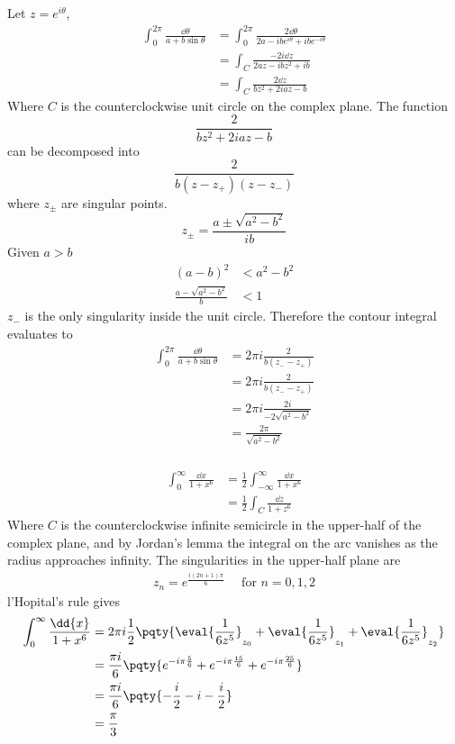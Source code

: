 \documentclass[12pt]{article}
\begin{document}
    \subsubsection{} Let \(z = e^{i\theta}\), \begin{align*}
        \int_0^{2\pi} \frac{\dd{\theta}}{a + b\sin\theta} &= \int_0^{2\pi} \frac{2\dd{\theta}}{2a - ib e^{i\theta} + ib e^{ - i\theta}}\\
        &= \int_C \frac{ -2i \dd{z}}{2a z - ib z^2 + ib }\\
        &= \int_C \frac{2 \dd{z}}{ bz^2 + 2iaz -b}
    \end{align*}
    Where \(C\) is the counterclockwise unit circle on the complex plane. The function \[
        \frac{2}{ bz^2 + 2iaz -b}
    \]
    can be decomposed into \[
        \frac{2}{b(z - z_ +)(z - z_ -)}
    \]where \(z_\pm\) are singular points. \[
        z_\pm = \frac{ a \pm \sqrt{a^2 - b^2}}{ib} 
    \] Given \(a > b\) \begin{align*}
        (a - b)^2 &< a^2 - b^2\\
        \frac{a - \sqrt{a^2 - b^2}}{b}  &< 1
    \end{align*}
    \(z_ -\) is the only singularity inside the unit circle. Therefore the contour integral evaluates to \begin{align*}
        \int_0^{2\pi} \frac{\dd{\theta}}{a + b\sin\theta} &= 2\pi i \frac{2}{b(z_ -- z_ +)}\\
        &= 2\pi i \frac{2}{b(z_ -- z_ +)}\\
        &= 2\pi i \frac{2i}{ - 2 \sqrt{a^2 - b^2}}\\
        &=  \frac{2\pi}{\sqrt{a^2 - b^2}}
    \end{align*}
    \subsubsection{}  \begin{align*}
        \int_0^\infty \frac{\dd{x}}{1 + x^6} &= \frac{1}{2} \int_{ - \infty}^\infty \frac{\dd{x}}{1 + x^6} \\
        &= \frac{1}{2} \int_C \frac{\dd{z}}{1 + z^6} 
    \end{align*}
    Where \(C\) is the counterclockwise infinite semicircle in the upper-half of the complex plane, and by Jordan's lemma the integral on the arc vanishes as the radius approaches infinity. The singularities in the upper-half plane are \begin{align*}
        z_n = e^{\frac{i(2n + 1)\pi}{6} } \quad \text{ for } n = 0,1,2
    \end{align*}
    l'Hopital's rule gives \begin{align*}
        \int_0^\infty \frac{\dd{x}}{1 + x^6} &= 2\pi i \frac{1}{2}\pqty{ \eval{\frac{1}{6z^5}}_{z_0} +\eval{\frac{1}{6z^5}}_{z_1} + \eval{\frac{1}{6z^5}}_{z_2} }\\
        &= \frac{\pi i}{6} \pqty{e^{ - i\pi \frac{5}{6}} + e^{ - i\pi \frac{15}{6}} + e^{ - i\pi \frac{25}{6}}} \\
        &= \frac{\pi i}{6} \pqty{ - \frac{i}{2} - i - \frac{i}{2}} \\
        &= \frac{\pi}{3}
    \end{align*}
\end{document}
